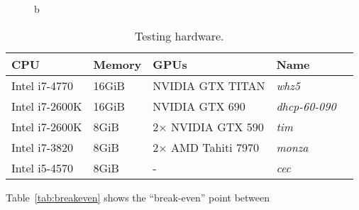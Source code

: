 \begin{figure}


\caption{b}
\label{fig:}
\end{figure}

\begin{table}
\footnotesize
\centering
\begin{tabular}{| l | l | l | l | l |}
\hline
\textbf{CPU} & \textbf{Memory} & \textbf{GPUs} & \textbf{Name}\\
\hline
Intel i7-4770 & 16GiB & NVIDIA GTX TITAN & \textit{whz5}\\
Intel i7-2600K & 16GiB & NVIDIA GTX 690 & \textit{dhcp-60-090}\\
Intel i7-2600K & 8GiB & 2$\times$ NVIDIA GTX 590 & \textit{tim}\\
Intel i7-3820 & 8GiB & 2$\times$ AMD Tahiti 7970 & \textit{monza}\\
Intel i5-4570 & 8GiB & - & \textit{cec}\\
\hline
\end{tabular}
\caption{Testing hardware.}
\label{tab:hw}
\end{table}

Table~\ref{tab:breakeven} shows the ``break-even'' point between

